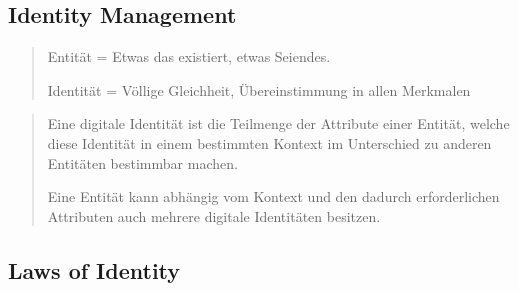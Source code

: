 \documentclass[a4paper, 11pt]{article}
\begin{document}
\subsection{Identity Management}
\blockquote{Entität = Etwas das existiert, etwas Seiendes.
	
	Identität = Völlige Gleichheit, Übereinstimmung in allen Merkmalen}

\blockquote{Eine digitale Identität ist die Teilmenge der Attribute einer Entität, welche diese Identität in einem bestimmten Kontext im Unterschied zu anderen Entitäten bestimmbar machen.

Eine Entität kann abhängig vom Kontext und den dadurch erforderlichen Attributen auch mehrere digitale Identitäten besitzen.}

\subsection{Laws of Identity}
\end{document}
